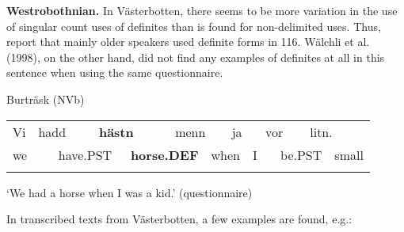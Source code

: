 \begin{styleBodytextC}
\textbf{Westrobothnian.} In Västerbotten, there seems to be more variation in the use of singular count uses of definites than is found for non-delimited uses. Thus, \citet{BergholmEtAl1999} report that mainly older speakers used definite forms in 116. Wälchli et al. (1998), on the other hand, did not find any examples of definites at all in this sentence when using the same questionnaire.

\end{styleBodytextC}

\begin{listWWNumileveli}
\item 

\begin{styleExample}
\label{bkm:Ref224103495}Burträsk (NVb)

\end{styleExample}

\end{listWWNumileveli}

\begin{tabular}{llllllllllllll}
\lsptoprule
Vi & \multicolumn{2}{l}{hadd

} & \multicolumn{2}{l}{{\bfseries hästn}

} & \multicolumn{2}{l}{menn

} & \multicolumn{2}{l}{ja

} & \multicolumn{2}{l}{vor

} & \multicolumn{2}{l}{litn.

} & \\
\multicolumn{2}{l}{we

} & \multicolumn{2}{l}{have.PST

} & \multicolumn{2}{l}{{\bfseries horse.DEF}

} & \multicolumn{2}{l}{when

} & \multicolumn{2}{l}{I 

} & \multicolumn{2}{l}{be.PST

} & \multicolumn{2}{l}{small

}\\
\lspbottomrule
\end{tabular}

\begin{styleTranslation}
‘We had a horse when I was a kid.’ (questionnaire)

\end{styleTranslation}

\begin{styleBodyTextFirst}
In transcribed texts from Västerbotten, a few examples are found, e.g.:

\end{styleBodyTextFirst}

